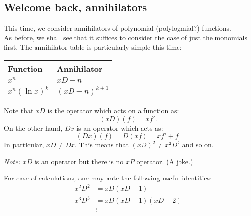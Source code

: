 \subsection{Welcome back, annihilators}
This time, we consider annihilators of polynomial (polylogmial?) functions.\\
As before, we shall see that it suffices to consider the case of just the monomials first. The annihilator table is particularly simple this time:
\begin{mdframed}[style=boxstyle, frametitle={Annihilators of special functions}]
	\begin{center}
	\bgroup
	\def\arraystretch{1.25}
	\begin{tabular}{|l|l|}
		\hline
		Function & Annihilator\\
		\hline
		$x^n$ & $xD - n$\\
		$x^n(\ln x)^k$ & $(xD - n)^{k+1}$\\
		\hline
	\end{tabular}
	\egroup
	\end{center}
\end{mdframed}
\begin{mdframed}[style=boxstyle, frametitle={A word on $xD$}]
	Note that $xD$ is the operator which acts on a function as:
	\begin{equation*} 
		(xD)(f) = xf'.
	\end{equation*}
	On the other hand, $Dx$ is an operator which acts as:
	\begin{equation*} 
		(Dx)(f) = D(xf) = xf' + f.
	\end{equation*}
	In particular, $xD \neq Dx.$ This means that $(xD)^2 \neq x^2D^2$ and so on.
\end{mdframed}
\emph{Note:} $xD$ is an operator but there is no $xP$ operator. \hfill (A joke.)
\begin{mdframed}[style=boxstyle, frametitle={Some arithmetic}]
	For ease of calculations, one may note the following useful identities:
	\begin{align*} 
		x^2D^2 &= xD(xD - 1)\\
		x^3D^3 &= xD(xD - 1)(xD - 2)\\
		&\vdots
	\end{align*}
\end{mdframed}
